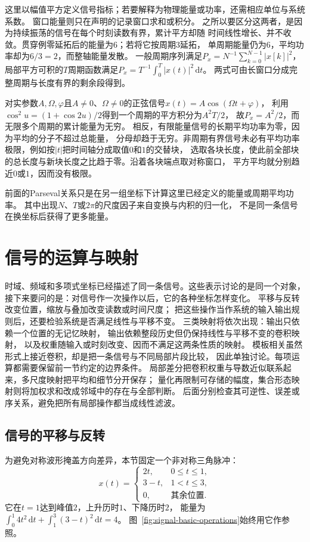 这里以幅值平方定义信号指标；若要解释为物理能量或功率，还需相应单位与系统系数。
窗口能量则只在声明的记录窗口求和或积分。
之所以要区分这两者，是因为持续振荡的信号在每个时刻读数有界，累计平方却随
时间线性增长、并不收敛。贯穿例零延拓后的能量为$6$；若将它按周期$3$延拓，
单周期能量仍为$6$，平均功率却为$6/3=2$，而整轴能量发散。
一般周期序列满足$P_x=N^{-1}\sum_{k=0}^{N-1}|x[k]|^2$，
局部平方可积的$T$周期函数满足$P_x=T^{-1}\int_0^T|x(t)|^2\,\mathrm dt$。
两式可由长窗口分成完整周期与长度有界的剩余段得到。

对实参数$A,\Omega,\varphi$且$A\neq0$、$\Omega\neq0$的正弦信号$x(t)=A\cos(\Omega t+\varphi)$，
利用$\cos^2 u=(1+\cos2u)/2$得到一个周期的平方积分为$A^2T/2$，
故$P_x=A^2/2$，而无限多个周期的累计能量为无穷。
相反，有限能量信号的长期平均功率为零，因为平均的分子不超过总能量，
分母却趋于无穷。非周期有界信号未必有平均功率极限，例如按$|t|$把时间轴分成取值$0$和$1$的交替块，
选取各块长度，使此前全部块的总长度与新块长度之比趋于零。沿着各块端点取对称窗口，
平方平均就分别趋近$0$或$1$，因而没有极限。

前面的Parseval关系只是在另一组坐标下计算这里已经定义的能量或周期平均功率。
其中出现$N$、$T$或$2\pi$的尺度因子来自变换与内积的归一化，
不是同一条信号在换坐标后获得了更多能量。

\section{信号的运算与映射}
\label{sec:signal-operations-maps}

时域、频域和多项式坐标已经描述了同一条信号。这些表示讨论的是同一个对象，
接下来要问的是：对信号作一次操作以后，它的各种坐标怎样变化。
平移与反转改变位置，缩放与叠加改变读数或时间尺度；
把这些操作当作系统的输入输出规则后，还要检验系统是否满足线性与平移不变。
三类映射将依次出现：输出只依赖一个位置的无记忆映射，
输出依赖整段历史但仍保持线性与平移不变的卷积映射，
以及权重随输入或时刻改变、因而不满足这两条性质的映射。
模板相关虽然形式上接近卷积，却是把一条信号与不同局部片段比较，
因此单独讨论。每项运算都需要保留前一节约定的边界条件。
局部差分把卷积权重与导数近似联系起来，多尺度映射把平均和细节分开保存；
量化再限制可存储的幅度，集合形态映射则将加权求和改成邻域中的存在与全部判断。
后面分别检查其可逆性、误差或序关系，避免把所有局部操作都当成线性滤波。

\subsection{信号的平移与反转}

为避免对称波形掩盖方向差异，本节固定一个非对称三角脉冲：
\begin{equation}
  x(t)=
  \begin{cases}
    2t,&0\leq t\leq1,\\
    3-t,&1<t\leq3,\\
    0,&\text{其余位置}.
  \end{cases}
  \label{eq:signal-asymmetric-wave}
\end{equation}
它在$t=1$达到峰值$2$，上升历时$1$、下降历时$2$，
能量为$\int_0^1 4t^2\,\mathrm dt+\int_1^3(3-t)^2\,\mathrm dt=4$。
图~\ref{fig:signal-basic-operations}始终用它作参照。

